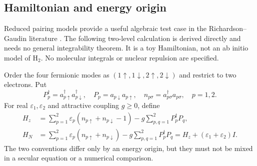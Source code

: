 \documentclass[11pt,a4paper]{article}
\theoremstyle{plain}
\theoremstyle{definition}
\theoremstyle{remark}
\begin{document}
\subsection{Hamiltonian and energy origin}
Reduced pairing models provide a useful algebraic test case in the
Richardson--Gaudin literature \citep{Richardson1963,Dukelsky2004}.
The following two-level calculation is derived directly and needs no general
integrability theorem. It is a toy Hamiltonian, not an ab initio model of
$\mathrm H_2$. No molecular integrals or nuclear repulsion are specified.

Order the four fermionic modes as
$(1\uparrow,1\downarrow,2\uparrow,2\downarrow)$ and restrict to two
electrons. Put
\[
 P_p^\dagger=a_{p\uparrow}^\dagger a_{p\downarrow}^\dagger,
 \quad P_p=a_{p\downarrow}a_{p\uparrow},\quad
 n_{p\sigma}=a_{p\sigma}^\dagger a_{p\sigma},\quad p=1,2.
\]
For real $\varepsilon_1,\varepsilon_2$ and attractive coupling $g\ge0$,
define
\begin{align}
 H_z&=\sum_{p=1}^2\varepsilon_p
       (n_{p\uparrow}+n_{p\downarrow}-1)
       -g\sum_{p,q=1}^2P_p^\dagger P_q,
       \label{eq:pair-z}\\
 H_N&=\sum_{p=1}^2\varepsilon_p
       (n_{p\uparrow}+n_{p\downarrow})
       -g\sum_{p,q=1}^2P_p^\dagger P_q
     =H_z+(\varepsilon_1+\varepsilon_2)I.
       \label{eq:pair-n}
\end{align}
The two conventions differ only by an energy origin, but they must not be
mixed in a secular equation or a numerical comparison.
\end{document}
